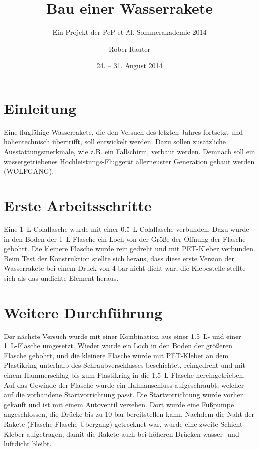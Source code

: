 

\title{Bau einer Wasserrakete}
\subtitle{Ein Projekt der PeP et Al. Sommerakademie 2014}
\date{24. -- 31. August 2014}

\author{
  Rober Rauter
}


\maketitle
\tableofcontents

\section{Einleitung}
Eine flugfähige Wasserrakete, die den Versuch des letzten Jahres fortsetzt und höhentechnisch übertrifft, soll entwickelt werden. Dazu sollen zusätzliche Ausstattungsmerkmale, wie z.B. ein Fallschirm, verbaut werden.
Demnach soll ein wassergetriebenes Hochleistungs-Fluggerät allerneuster Generation gebaut werden (WOLFGANG).

\section{Erste Arbeitsschritte}
Eine \SI{1}{\liter}-Colaflasche wurde mit einer \SI{0.5}{\liter}-Colaflasche verbunden. Dazu wurde in den Boden der \SI{1}{\liter}-Flasche ein Loch von der Größe der Öffnung der Flasche gebohrt. Die kleinere Flasche wurde rein gedreht und mit PET-Kleber verbunden.
Beim Test der Konstruktion stellte sich heraus, dass diese erste Version der Wasserrakete bei einem Druck von 4 bar nicht dicht war, die Klebestelle stellte sich als das undichte Element heraus.

\section{Weitere Durchführung}
Der nächste Versuch wurde mit einer Kombination aus einer \SI{1.5}{\liter}- und einer \SI{1}{\liter}-Flasche umgesetzt.
Wieder wurde ein Loch in den Boden der größeren Flasche gebohrt, und die kleinere Flasche wurde mit PET-Kleber an dem Plastikring unterhalb des Schraubverschlusses beschichtet, reingedreht und mit einem Hammerschlag bis zum Plastikring in die \SI{1.5}{\liter}-Flasche hereingetrieben.
Auf das Gewinde der Flasche wurde ein Hahnanschluss aufgeschraubt, welcher auf die vorhandene Startvorrichtung passt. Die Startvorrichtung wurde vorher gekauft und ist mit einem Autoventil versehen. Dort wurde eine Fußpumpe angeschlossen, die Drücke bis zu 10 bar bereitstellen kann. 
Nachdem die Naht der Rakete (Flasche-Flasche-Übergang) getrocknet war, wurde eine zweite Schicht Kleber aufgetragen, damit die Rakete auch bei höheren Drücken wasser- und luftdicht  bleibt.
  
